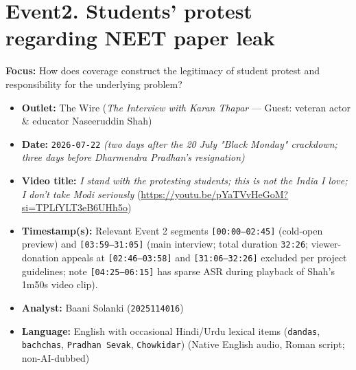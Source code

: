 \documentclass[10pt,a4paper]{article}
\begin{document}
\section*{Event2. Students' protest regarding NEET paper leak}
\textbf{Focus:} How does coverage construct the legitimacy of student protest and responsibility for the underlying problem?

\begin{itemize}[leftmargin=1.5em, itemsep=3pt, topsep=4pt]
  \item \textbf{Outlet:} The Wire (\textit{The Interview with Karan Thapar} --- Guest: veteran actor \& educator Naseeruddin Shah)
  \item \textbf{Date:} \texttt{2026-07-22} \textit{(two days after the 20 July "Black Monday" crackdown; three days before Dharmendra Pradhan's resignation)}
  \item \textbf{Video title:} \textit{I stand with the protesting students; this is not the India I love; I don't take Modi seriously} (\url{https://youtu.be/pYaTVvHeGoM?si=TPLfYLT3eB6UHh5o})
  \item \textbf{Timestamp(s):} Relevant Event 2 segments \texttt{[00:00--02:45]} (cold-open preview) and \texttt{[03:59--31:05]} (main interview; total duration \texttt{32:26}; viewer-donation appeals at \texttt{[02:46--03:58]} and \texttt{[31:06--32:26]} excluded per project guidelines; note \texttt{[04:25--06:15]} has sparse ASR during playback of Shah's 1m50s video clip).
  \item \textbf{Analyst:} Baani Solanki (\texttt{2025114016})
  \item \textbf{Language:} English with occasional Hindi/Urdu lexical items (\texttt{dandas}, \texttt{bachchas}, \texttt{Pradhan Sevak}, \texttt{Chowkidar}) (Native English audio, Roman script; non-AI-dubbed)
\end{itemize}
\end{document}
